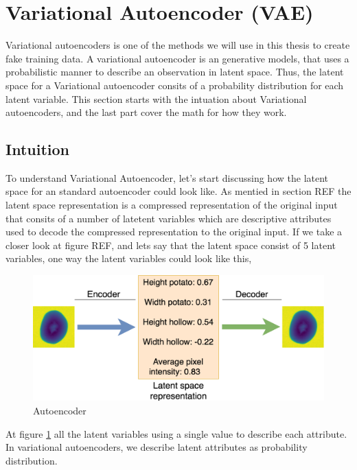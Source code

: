 \documentclass[11pt]{article}
\begin{document}
\section{Variational Autoencoder (VAE)}

Variational autoencoders is one of the methods we will use in this thesis to create fake training data. A variational autoencoder is an generative models, that uses a probabilistic manner to describe an observation in latent space. Thus, the latent space for a Variational autoencoder consits of a probability distribution for each latent variable. This section starts with the intuation about Variational autoencoders, and the last part cover the math for how they work.

\subsection{Intuition}

To understand Variational Autoencoder, let's start discussing how the latent space for an standard autoencoder could look like. As mentied in section REF the latent space representation is a compressed representation of the original input that consits of a number of latetent variables which are descriptive attributes used to decode the compressed representation to the original input. If we take a closer look at figure REF, and lets say that the latent space consist of 5 latent variables, one way the latent variables could look like this,

\begin{figure}[!h]
    \centering
    \includegraphics[scale=0.25]{figurer/vae/vae_intution.png}
    \caption{Autoencoder}
    \label{fig:vae}
\end{figure}

At figure \ref{fig:vae} all the latent variables using a single value to describe each attribute. In variational autoencoders, we describe latent attributes as probability distribution. 
\end{document}
